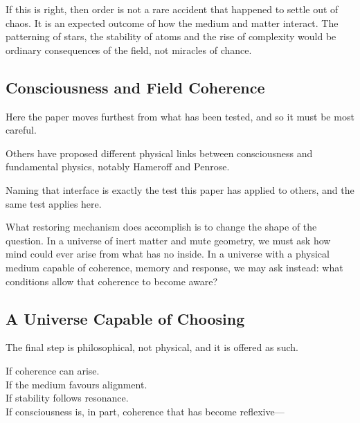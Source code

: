 \documentclass[11pt,a4paper]{article}
\begin{document}
If this is right, then order is not a rare accident that happened to settle out of chaos. It is an expected outcome of how the medium and matter interact. The patterning of stars, the stability of atoms and the rise of complexity would be ordinary consequences of the field, not miracles of chance.


\subsection{Consciousness and Field Coherence}

Here the paper moves furthest from what has been tested, and so it must be most careful.

 Others have proposed different physical links between consciousness and fundamental physics, notably Hameroff and Penrose.

 Naming that interface is exactly the test this paper has applied to others, and the same test applies here.

What restoring mechanism does accomplish is to change the shape of the question. In a universe of inert matter and mute geometry, we must ask how mind could ever arise from what has no inside. In a universe with a physical medium capable of coherence, memory and response, we may ask instead: what conditions allow that coherence to become aware?

\subsection{A Universe Capable of Choosing}

The final step is philosophical, not physical, and it is offered as such.

If coherence can arise.\\
If the medium favours alignment.\\
If stability follows resonance.\\
If consciousness is, in part, coherence that has become reflexive---
\end{document}

